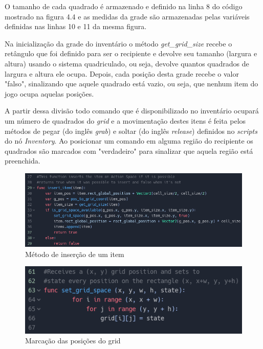 O tamanho de cada quadrado é armazenado e definido na linha 8 do código mostrado
na figura 4.4
e as medidas da grade são armazenadas pelas variáveis definidas nas linhas
10 e 11 da mesma figura.

Na inicialização da grade do inventário o método \textit{get\_grid\_size} 
recebe o retângulo que foi definido para ser o recipiente e devolve seu 
tamanho (largura e altura) usando o sistema quadriculado, ou seja, devolve 
quantos quadrados de largura e altura ele ocupa. Depois, cada posição 
desta grade recebe o valor "falso", sinalizando que aquele quadrado está vazio,
ou seja, que nenhum item do jogo ocupa aquelas posições.

A partir dessa divisão todo comando que é disponibilizado no inventário ocupará
um número de quadrados do \textit{grid} e a movimentação destes itens é feita 
pelos métodos de pegar (do inglês \textit{grab}) e soltar (do inglês 
\textit{release}) definidos no \textit{scripts} do nó \textit{Inventory}. Ao
posicionar um comando em alguma região do recipiente os quadrados são marcados
com "verdadeiro" para sinalizar que aquela região está preenchida.

\begin{figure}[H]
    \includegraphics[scale=0.6]{../figuras/insere_item.png}
    \caption{Método de inserção de um item}
\end{figure}

\begin{figure}[H]
    \includegraphics[scale=0.7]{../figuras/marca_grid.png}
    \caption{Marcação das posições do grid}
\end{figure}

